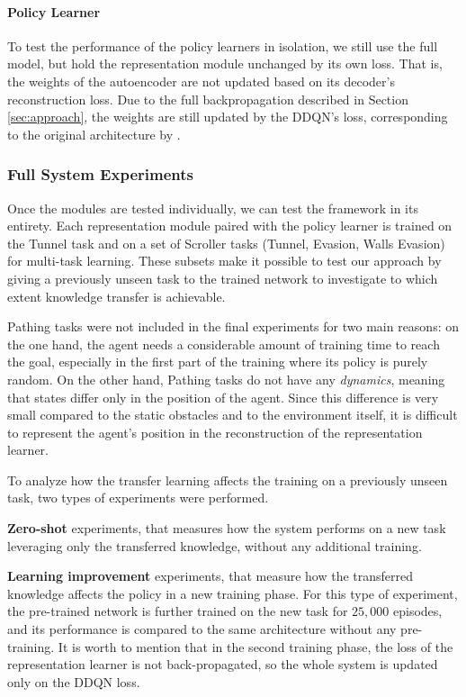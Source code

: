 \paragraph{Policy Learner}
To test the performance of the policy learners in isolation, we still use the full model, but hold the representation module unchanged by its own loss.
That is, the weights of the autoencoder are not updated based on its decoder's reconstruction loss.
Due to the full backpropagation described in Section \ref{sec:approach}, the weights are still updated by the DDQN's loss, corresponding to the original architecture by \citet{DQN}. 

\subsubsection{Full System Experiments}
Once the modules are tested individually, we can test the framework in its entirety.
Each representation module paired with the policy learner is trained on the Tunnel task and on a set of Scroller tasks (Tunnel, Evasion, Walls Evasion) for multi-task learning. 
These subsets make it possible to test our approach by giving a previously unseen task to the trained network to investigate to which extent knowledge transfer is achievable.

Pathing tasks were not included in the final experiments for two main reasons: on the one hand, the agent needs a considerable amount of training time to reach the goal, especially in the first part of the training where its policy is purely random. On the other hand, Pathing tasks do not have any \textit{dynamics}, meaning that states differ only in the position of the agent. Since this difference is very small compared to the static obstacles and to the environment itself, it is difficult to represent the agent's position in the reconstruction of the representation learner.

To analyze how the transfer learning affects the training on a previously unseen task, two types of experiments were performed.

\textbf{Zero-shot} experiments, that measures how the system performs on a new task leveraging only the transferred knowledge, without any additional training.

\textbf{Learning improvement} experiments, that measure how the transferred knowledge affects the policy in a new training phase. 
For this type of experiment, the pre-trained network is further trained on the new task for $25,000$ episodes, and its performance is compared to the same architecture without any pre-training. 
It is worth to mention that in the second training phase, the loss of the representation learner is not back-propagated, so the whole system is updated only on the DDQN loss.

